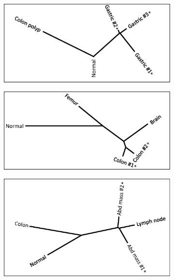 \begin{figure}[htp]
	\centering
	\begin{subfigure}{0.49\textwidth}
		\includegraphics[width=\linewidth,keepaspectratio]{images/msiclones/supp_nj_1}
		\caption{}\label{fig:msiclones:NJ_trees_1}
	\end{subfigure}%
	\hfill%
	\begin{subfigure}{0.49\textwidth}
		\includegraphics[width=\linewidth,keepaspectratio]{images/msiclones/supp_nj_2}
		\caption{}\label{fig:msiclones:NJ_trees_2}
	\end{subfigure}
	\par
	\begin{subfigure}{0.49\textwidth}
		\includegraphics[width=\linewidth,keepaspectratio]{images/msiclones/supp_nj_3}

\end{subfigure}
\end{figure}
